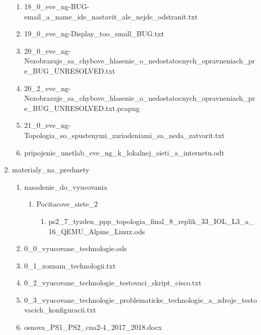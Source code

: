 \begin{enumerate}[noitemsep,label*=\thesection.\arabic*.]
\begin{enumerate}[noitemsep,label*=\arabic*.]
        \item \label{item:mail_meno_nejde_odstranit} 18\_0\_eve\_ng-BUG-email\_a\_name\_ide\_nastavit\_ale\_nejde\_odstranit.txt
        \item \label{item:display_too_small} 19\_0\_eve\_ng-Display\_too\_small\_BUG.txt
        \item \label{item:nezobrazene_chybove_hlasenie} 20\_0\_eve\_ng-Nezobrazuje\_sa\_chybove\_hlasenie\_o\_nedostatocnych\_opravneniach\_pre\_BUG\_UNRESOLVED.txt
        \item \label{item:nezobrazene_chybove_hlasenie_pcap} 20\_2\_eve\_ng-Nezobrazuje\_sa\_chybove\_hlasenie\_o\_nedostatocnych\_opravneniach\_pre\_BUG\_UNRESOLVED.txt.pcapng
        \item \label{item:zatvorenie_topologie_so_spustenymi_zariadeniami} 21\_0\_eve\_ng-Topologia\_so\_spustenymi\_zariadeniami\_sa\_neda\_zatvorit.txt
        \item pripojenie\_unetlab\_eve\_ng\_k\_lokalnej\_sieti\_a\_internetu.odt
    \end{enumerate}
    
    \item materialy\_na\_predmety
    
    \begin{enumerate}[noitemsep,label*=\arabic*.]
        \item nasadenie\_do\_vyucovania
        
        \begin{enumerate}[noitemsep,label*=\arabic*.]
            \item Pocitacove\_siete\_2
            
            \begin{enumerate}[noitemsep,label*=\arabic*.]
                \item \label{item:nasadenie_ps2_benchmark} ps2\_7\_tyzden\_ppp\_topologia\_final\_8\_replik\_33\_IOL\_L3\_a\_16\_QEMU\_Alpine\_Linux.ods
            \end{enumerate}
        \end{enumerate}
        
        \item \label{item:zoznam_technologii_s_podporou_zariadeni} 0\_0\_vyucovane\_technologie.ods
        \item \label{item:zoznam_technologii_txt} 0\_1\_zoznam\_technologii.txt
        \item \label{item:cisco_feature_testing_skript} 0\_2\_vyucovane\_technologie\_testovaci\_skript\_cisco.txt
        \item 0\_3\_vyucovane\_technologie\_problematicke\_technologie\_a\_zdroje\_testovacich\_konfiguracii.txt
        \item osnova\_PS1\_PS2\_cna2-4\_2017\_2018.docx
    \end{enumerate}
    

\end{enumerate}
